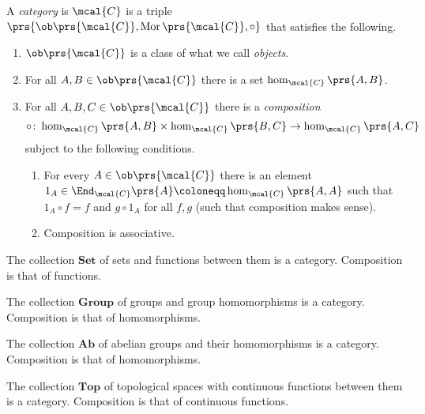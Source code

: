 \documentclass[11pt]{kbook}
\DeclareMathOperator{\Mor}{Mor}
\begin{document}
\begin{definition}[Category]
A \emph{category} is $\mcal{C}$ is a triple $\prs{\ob\prs{\mcal{C}}, \Mor\prs{\mcal{C}}, \circ}$ that satisfies the following.

\begin{enumerate}[label = (\roman*)]
\item $\ob\prs{\mcal{C}}$ is a class of what we call \emph{objects}.
\item For all $A,B \in \ob\prs{\mcal{C}}$ there is a set $\hom_{\mcal{C}}\prs{A,B}$.
\item For all $A,B,C \in \ob\prs{\mcal{C}}$ there is a \emph{composition}
\[\circ \colon \hom_{\mcal{C}}\prs{A,B} \times \hom_{\mcal{C}}\prs{B,C} \to \hom_{\mcal{C}}\prs{A,C}\]
subject to the following conditions.
\begin{enumerate}[label = (\Roman*)]
\item For every $A \in \ob\prs{\mcal{C}}$ there is an element $1_A \in \End_{\mcal{C}}\prs{A} \coloneqq \hom_{\mcal{C}}\prs{A,A}$ such that $1_A \circ f = f$ and $g \circ 1_A$ for all $f,g$ (such that composition makes sense).
\item Composition is associative.
\end{enumerate}
\end{enumerate}
\end{definition}

\begin{example}
The collection $\mathbf{Set}$ of sets and functions between them is a category. Composition is that of functions.
\end{example}

\begin{example}
The collection $\mathbf{Group}$ of groups and group homomorphisms is a category. Composition is that of homomorphisms.
\end{example}

\begin{example}[$\mathbf{Ab}$]
The collection $\mathbf{Ab}$ of abelian groups and their homomorphisms is a category. Composition is that of homomorphisms.
\end{example}

\begin{example}
The collection $\mathbf{Top}$ of topological spaces with continuous functions between them is a category. Composition is that of continuous functions.
\end{example}
\end{document}
